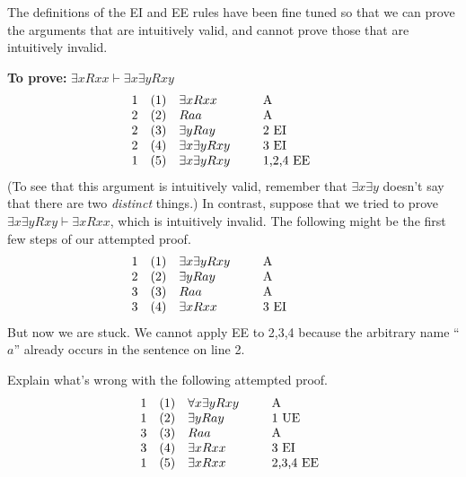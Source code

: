  

The definitions of the EI and EE rules have been fine tuned so that we
can prove the arguments that are intuitively valid, and cannot prove
those that are intuitively invalid.

\medskip \noindent \textbf{To prove:} $\exists xRxx\vdash \exists x\exists yRxy$
\[ \begin{array}{l l >{$}p{2cm}<{$} p{2cm}}
     1 & (1) & \exists xRxx & A \\
     2 & (2) & Raa          & A \\
     2 & (3) & \exists yRay & 2 EI \\
     2 & (4) & \exists x\exists yRxy & 3 EI \\
     1 & (5) & \exists x\exists yRxy & 1,2,4 EE \end{array} \] (To see
 that this argument is intuitively valid, remember that $\exists
 x\exists y$ doesn't say that there are two {\it distinct} things.)
 In contrast, suppose that we tried to prove $\exists x\exists
 yRxy\vdash\exists xRxx$, which is intuitively invalid.  The following
 might be the first few steps of our attempted proof. 
\[ \begin{array}{l l >{$}p{2cm}<{$} p{2cm}}
1 & (1) & \exists x\exists yRxy & A \\
2 & (2) & \exists yRay & A \\
3 & (3) & Raa          & A \\
3 & (4) & \exists xRxx & 3 EI \end{array} \]
But now we are stuck.  We cannot apply EE to 2,3,4 because the
arbitrary name ``$a$'' already occurs in the sentence on line 2.  
 
\begin{exercise} Explain what's wrong with the following attempted
  proof. 
\[ \begin{array}{l l >{$}p{2cm}<{$} p{1.5cm}}
     1 & (1) & \forall x\exists yRxy & A \\
     1 & (2) & \exists yRay & 1 UE \\
     3 & (3) & Raa &   A\\
     3 & (4) & \exists xRxx & 3 EI \\
     1 & (5) & \exists xRxx & 2,3,4 EE  \end{array} \] \end{exercise} 

